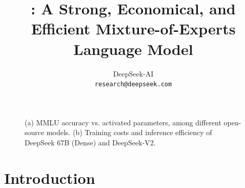 \documentclass[11pt, a4paper, logo, copyright, nonumbering]{deepseek}
\title{\centering \dsvii{}: A Strong, Economical, and Efficient Mixture-of-Experts Language Model}
\author[*]{
DeepSeek-AI
\\
\small
\texttt{research@deepseek.com}
}
\newcommand{\dsvi}{DeepSeek 67B}
\newcommand{\dsvii}{DeepSeek-V2}
\begin{document}
\begin{CJK*}{UTF8}{gbsn}

\maketitle

\begin{figure}[ht]
    \centering
    \label{fig:first_page}
    \caption{
    (a) MMLU accuracy vs. activated parameters, among different open-source models. 
    (b) Training costs and inference efficiency of \dsvi{} (Dense) and \dsvii{}.
    }
\end{figure}


\newpage

\begin{spacing}{0.9}
\tableofcontents
\end{spacing}

\newpage

\section{Introduction}


\end{CJK*}
\end{document}
